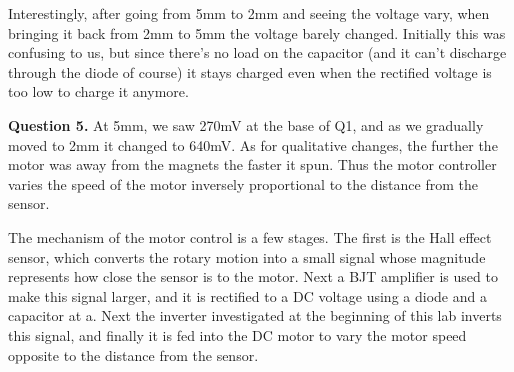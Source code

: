 \documentclass[letterpaper, reqno,11pt]{article}
\begin{document}
Interestingly, after going from 5mm to 2mm and seeing the voltage vary, when bringing it back from 2mm to 5mm the voltage barely changed. Initially this was confusing to us, but since there's no load on the capacitor (and it can't discharge through the diode of course) it stays charged even when the rectified voltage is too low to charge it anymore.

{\medskip\noindent\bf Question 5.} At 5mm, we saw 270mV at the base of Q1, and as we gradually moved to 2mm it changed to 640mV. As for qualitative changes, the further the motor was away from the magnets the faster it spun. Thus the motor controller varies the speed of the motor inversely proportional to the distance from the sensor.

The mechanism of the motor control is a few stages. The first is the Hall effect sensor, which converts the rotary motion into a small signal whose magnitude represents how close the sensor is to the motor. Next a BJT amplifier is used to make this signal larger, and it is rectified to a DC voltage using a diode and a capacitor at a. Next the inverter investigated at the beginning of this lab inverts this signal, and finally it is fed into the DC motor to vary the motor speed opposite to the distance from the sensor.
\end{document}
